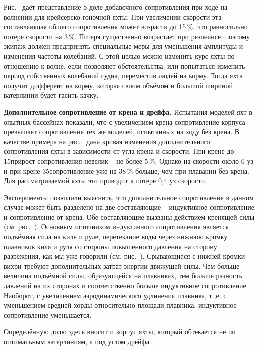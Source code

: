 Рис.~ даёт представление о доле добавочного сопротивления при
ходе на волнении для крейсерско-гоночной яхты. При увеличении скорости
эта составляющая общего сопротивления может возрасти до 15\,\%, что равносильно потере скорости на 3\,\%. Потеря
существенно возрастает при резонансе, поэтому экипаж должен
предпринять специальные меры для уменьшения амплитуды и изменения
частоты колебаний. С этой целью можно изменить курс яхты по отношению
к волне, если позволяют обстоятельства, или попытаться изменить период
собственных колебаний судна, переместив людей на корму. Тогда яхта
получит дифферент на корму, которая своим объёмом и большой шириной
ватерлинии будет гасить качку.

\textbf{Дополнительное сопротивление от крена и дрейфа.}
Испытания моделей яхт в опытных бассейнах показали, что с увеличением крена
сопротивление корпуса превышает сопротивление тех же моделей,
испытанных на ходу без крена. В качестве примера на рис.~ дана
кривая изменения дополнительного сопротивления яхты в зависимости от
угла крена и скорости. При крене до 15\gr прирост сопротивления
невелик \--- не более 5\,\%. Однако на скорости около 6 уз и при крене
35\gr сопротивление уже на 38\,\% больше, чем при плавании без
крена. Для рассматриваемой яхты это приводит к потере 0,4 уз скорости.

Эксперименты позволили выяснить, что дополнительное сопротивление в
данном случае может быть разделено на две составляющие \---
индуктивное сопротивление и сопротивление от крена. Обе составляющие
вызваны действием кренящей силы 
(см. рис.~). Основным источником индуктивного сопротивления
является подъёмная сила на киле и руле, перетекание воды через нижнюю
кромку плавников киля и руля со стороны повышенного давления на
сторону разрежения, как мы уже говорили
(см. рис.~). Срывающиеся с нижней кромки вихри требуют
дополнительных затрат энергии движущей силы. Чем больше величина
подъёмной силы, образующейся на плавниках, тем больше разность
давлений на их сторонах и соответственно больше индуктивное
сопротивление. Наоборот, с увеличением аэродинамического удлинения
плавника, т.\=,е. с уменьшением средней хорды относительно площади
плавника, индуктивное сопротивление уменьшается.

Определённую долю здесь вносит и корпус яхты, который обтекается не по
оптимальным ватерлиниям, а под углом дрейфа.

